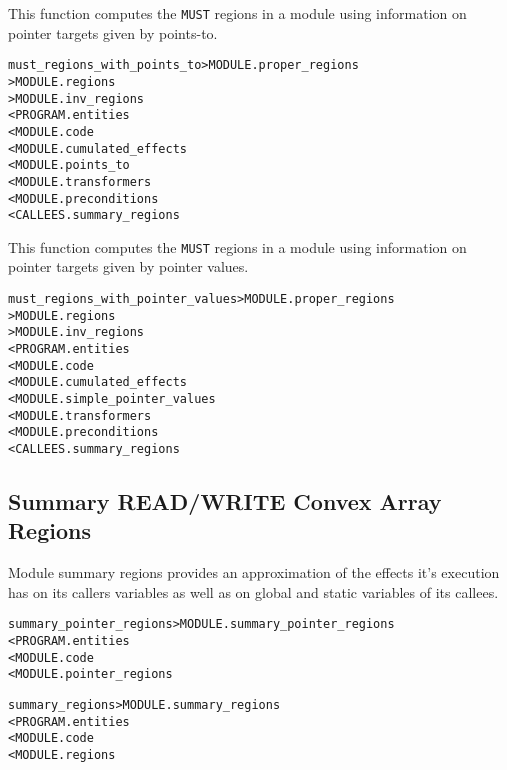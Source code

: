\documentclass[a4paper]{report}
\newenvironment{PipsMake}{\begin{alltt}}{\end{alltt}}
\newenvironment{PipsPass}[1]{\label{pass:#1}}{}
\begin{document}
\begin{PipsPass}{must_regions_with_points_to}
This function computes the \verb|MUST| regions in a module using
  information on pointer targets given by points-to.
\end{PipsPass}
\begin{PipsMake}
must_regions_with_points_to     > MODULE.proper_regions
                                > MODULE.regions
                                > MODULE.inv_regions
        < PROGRAM.entities
        < MODULE.code
        < MODULE.cumulated_effects
        < MODULE.points_to
        < MODULE.transformers
        < MODULE.preconditions
        < CALLEES.summary_regions
\end{PipsMake}

\begin{PipsPass}{must_regions_with_pointer_values}
  This function computes the \verb|MUST| regions in a module using
  information on pointer targets given by pointer values.
\end{PipsPass}
\begin{PipsMake}
must_regions_with_pointer_values > MODULE.proper_regions
                                > MODULE.regions
                                > MODULE.inv_regions
        < PROGRAM.entities
        < MODULE.code
        < MODULE.cumulated_effects
        < MODULE.simple_pointer_values
        < MODULE.transformers
        < MODULE.preconditions
        < CALLEES.summary_regions
\end{PipsMake}



\subsection{Summary READ/WRITE Convex Array Regions}
\label{subsubsection-summary-regions}

Module summary regions provides an approximation of the effects it's
execution has on its callers variables as well as on global and
static variables of its callees.

\begin{PipsMake}
summary_pointer_regions                 > MODULE.summary_pointer_regions
        < PROGRAM.entities
        < MODULE.code
        < MODULE.pointer_regions
\end{PipsMake}
\begin{PipsMake}
summary_regions                 > MODULE.summary_regions
        < PROGRAM.entities
        < MODULE.code
        < MODULE.regions
\end{PipsMake}
\end{document}
